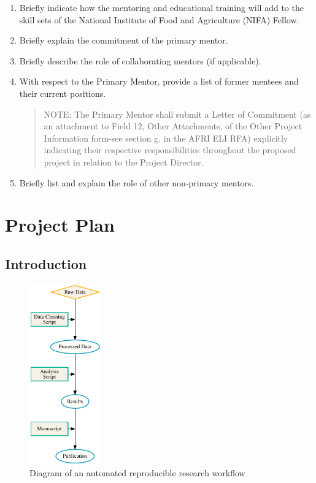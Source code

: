 \documentclass[12pt,letterpaper]{article}
\begin{document}
\begin{enumerate}

  \item Briefly indicate how the mentoring and educational training will add to the
   skill sets of the National Institute of Food and Agriculture (NIFA) Fellow.

  \item Briefly explain the commitment of the primary mentor.

  \item Briefly describe the role of collaborating mentors (if applicable).

  \item With respect to the Primary Mentor, provide a list of former mentees and
   their current positions. 
   \begin{quote}
   NOTE: The Primary Mentor shall submit a Letter of Commitment (as an
   attachment to Field 12, Other Attachments, of the Other Project
   Information form-see section g. in the AFRI ELI RFA) explicitly
   indicating their respective responsibilities throughout the proposed
   project in relation to the Project Director.
   \end{quote}

  \item Briefly list and explain the role of other non-primary mentors.

\end{enumerate}


\section{Project Plan}

\subsection{Introduction}

\begin{figure} %
  \includegraphics[width=0.275\textwidth]{figure/rr.pdf}
  \caption{Diagram of an automated reproducible research workflow}
  \label{fig:rr}
\end{figure}
\end{document}
